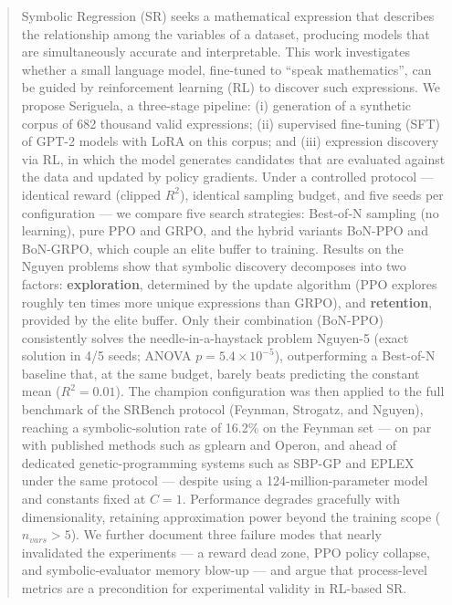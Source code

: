 \documentclass[Ingles, hidelinks]{ic-tese-v3} %
\begin{document}
\begin{abstract}
Symbolic Regression (SR) seeks a mathematical expression that describes the relationship among the variables of a dataset, producing models that are simultaneously accurate and interpretable. This work investigates whether a small language model, fine-tuned to ``speak mathematics'', can be guided by reinforcement learning (RL) to discover such expressions. We propose Seriguela, a three-stage pipeline: (i) generation of a synthetic corpus of 682 thousand valid expressions; (ii) supervised fine-tuning (SFT) of GPT-2 models with LoRA on this corpus; and (iii) expression discovery via RL, in which the model generates candidates that are evaluated against the data and updated by policy gradients. Under a controlled protocol --- identical reward (clipped $R^2$), identical sampling budget, and five seeds per configuration --- we compare five search strategies: Best-of-N sampling (no learning), pure PPO and GRPO, and the hybrid variants BoN-PPO and BoN-GRPO, which couple an elite buffer to training. Results on the Nguyen problems show that symbolic discovery decomposes into two factors: \textbf{exploration}, determined by the update algorithm (PPO explores roughly ten times more unique expressions than GRPO), and \textbf{retention}, provided by the elite buffer. Only their combination (BoN-PPO) consistently solves the needle-in-a-haystack problem Nguyen-5 (exact solution in 4/5 seeds; ANOVA $p=5.4\times10^{-5}$), outperforming a Best-of-N baseline that, at the same budget, barely beats predicting the constant mean ($R^2 = 0.01$). The champion configuration was then applied to the full benchmark of the SRBench protocol (Feynman, Strogatz, and Nguyen), reaching a symbolic-solution rate of 16.2\% on the Feynman set --- on par with published methods such as gplearn and Operon, and ahead of dedicated genetic-programming systems such as SBP-GP and EPLEX under the same protocol --- despite using a 124-million-parameter model and constants fixed at $C=1$. Performance degrades gracefully with dimensionality, retaining approximation power beyond the training scope ($n_{vars}>5$). We further document three failure modes that nearly invalidated the experiments --- a reward dead zone, PPO policy collapse, and symbolic-evaluator memory blow-up --- and argue that process-level metrics are a precondition for experimental validity in RL-based SR.
\end{abstract}

\listoffigures
\listoftables

\tableofcontents

\fimdaspaginasiniciais










\begin{appendices}

\end{appendices}
\end{document}

